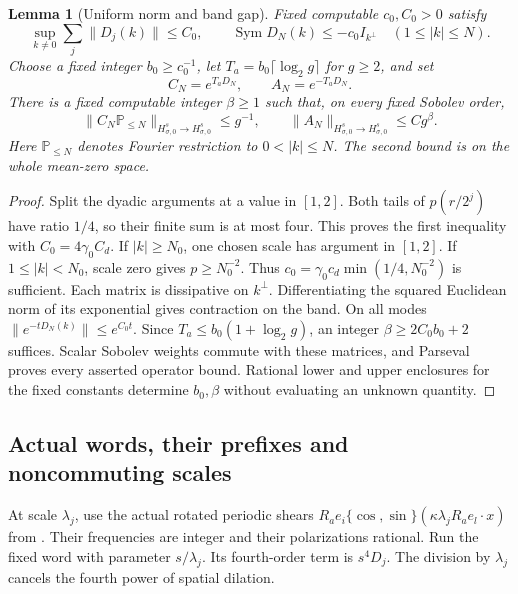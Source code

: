 \documentclass[11pt,a4paper]{amsart}
\newtheorem{lemma}[theorem]{Lemma}
\theoremstyle{definition}
\theoremstyle{remark}
\numberwithin{equation}{section}
\newcommand{\PP}{\mathbb P}
\newcommand{\norm}[1]{\lVert #1\rVert}
\begin{document}
\begin{lemma}[Uniform norm and band gap]\label{lem:amp-dyadic}
Fixed computable $c_0,C_0>0$ satisfy
\begin{equation}\label{eq:amp-dyadic-bounds}
 \sup_{k\ne0}\sum_j\norm{D_j(k)}\le C_0,\qquad
 \operatorname{Sym}D_N(k)\le-c_0I_{k^\perp}
       \quad(1\le|k|\le N).
\end{equation}
Choose a fixed integer $b_0\ge c_0^{-1}$, let
$T_a=b_0\lceil\log_2g\rceil$ for $g\ge2$, and set
\begin{equation}\label{eq:amp-multipliers}
 C_N=e^{T_aD_N},\qquad A_N=e^{-T_aD_N}.
\end{equation}
There is a fixed computable integer $\beta\ge1$ such that, on every
fixed Sobolev order,
\begin{equation}\label{eq:amp-global-gain}
 \norm{C_N\PP_{\le N}}_{H^s_{\sigma,0}\to H^s_{\sigma,0}}\le g^{-1},
 \qquad
 \norm{A_N}_{H^s_{\sigma,0}\to H^s_{\sigma,0}}\le Cg^\beta.
\end{equation}
Here $\PP_{\le N}$ denotes Fourier restriction to $0<|k|\le N$.
The second bound is on the whole mean-zero space.
\end{lemma}
\begin{proof}
Split the dyadic arguments at a value in $[1,2]$.  Both tails of
$p(r/2^j)$ have ratio $1/4$, so their finite sum is at most four.
This proves the first inequality with $C_0=4\gamma_0C_d$.
If $|k|\ge N_0$, one chosen scale has argument in $[1,2]$.
If $1\le|k|<N_0$, scale zero gives $p\ge N_0^{-2}$.
Thus $c_0=\gamma_0c_d\min(1/4,N_0^{-2})$ is sufficient.
Each matrix is dissipative on $k^\perp$.  Differentiating the squared
Euclidean norm of its exponential gives contraction on the band.
On all modes $\norm{e^{-tD_N(k)}}\le e^{C_0t}$.
Since $T_a\le b_0(1+\log_2g)$, an integer
$\beta\ge2C_0b_0+2$ suffices.  Scalar Sobolev weights commute with these
matrices, and Parseval proves every asserted operator bound.
Rational lower and upper enclosures for the fixed constants determine
$b_0,\beta$ without evaluating an unknown quantity.
\end{proof}

\subsection{Actual words, their prefixes and noncommuting scales}
At scale $\lambda_j$, use the actual rotated periodic shears
$R_ae_i\{\cos,\sin\}(\kappa\lambda_jR_ae_l\cdot x)$ from
\cite[Section~4]{Common}.  Their frequencies are integer and their
polarizations rational.  Run the fixed word with parameter $s/\lambda_j$.
Its fourth-order term is $s^4D_j$.  The division by $\lambda_j$
cancels the fourth power of spatial dilation.
\end{document}
